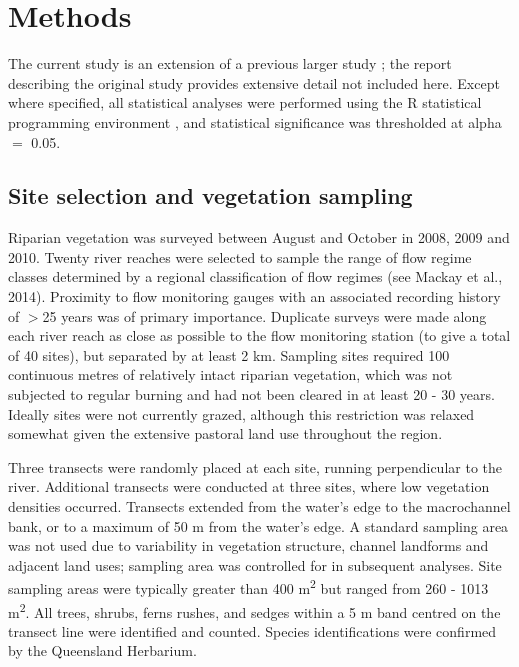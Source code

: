 \documentclass[openright,12pt,a4paper]{memoir}
\begin{document}
\section{Methods}
The current study is an extension of a previous larger study \citep{Arthington2012}; the report describing the original study provides extensive detail not included here. Except where specified, all statistical analyses were performed using the R statistical programming environment \citep{RCoreTeam2015}, and statistical significance was thresholded at alpha $=$ 0.05.

\subsection{Site selection and vegetation sampling}
Riparian vegetation was surveyed between August and October in 2008, 2009 and 2010. Twenty river reaches were selected to sample the range of flow regime classes determined by a regional classification of flow regimes (see Mackay et al., 2014). Proximity to flow monitoring gauges with an associated recording history of $>$25 years was of primary importance. Duplicate surveys were made along each river reach as close as possible to the flow monitoring station (to give a total of 40 sites), but separated by at least 2 km. Sampling sites required 100 continuous metres of relatively intact riparian vegetation, which was not subjected to regular burning and had not been cleared in at least 20 - 30 years. Ideally sites were not currently grazed, although this restriction was relaxed somewhat given the extensive pastoral land use throughout the region. 

Three transects were randomly placed at each site, running perpendicular to the river. Additional transects were conducted at three sites, where low vegetation densities occurred. Transects extended from the water’s edge to the macrochannel bank, or to a maximum of 50 m from the water’s edge. A standard sampling area was not used due to variability in vegetation structure, channel landforms and adjacent land uses; sampling area was controlled for in subsequent analyses. Site sampling areas were typically greater than 400 m\textsuperscript{2} but ranged from 260 - 1013 m\textsuperscript{2}. All trees, shrubs, ferns rushes, and sedges within a 5 m band centred on the transect line were identified and counted. Species identifications were confirmed by the Queensland Herbarium. 
\end{document}
